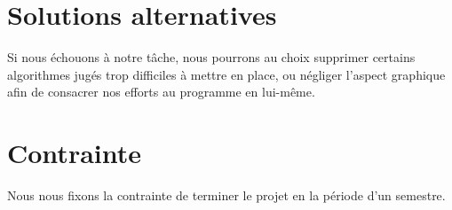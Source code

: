 \documentclass[12pt]{report}
\begin{document}
  \section{Solutions alternatives}
  
  Si nous échouons à notre tâche, nous pourrons au choix supprimer certains
   algorithmes jugés trop difficiles à mettre en place, ou négliger l'aspect
   graphique afin de consacrer nos efforts au programme en lui-même.

  \section{Contrainte}
  
  Nous nous fixons la contrainte de terminer le projet en la période
   d'un semestre.
  
\end{document}
